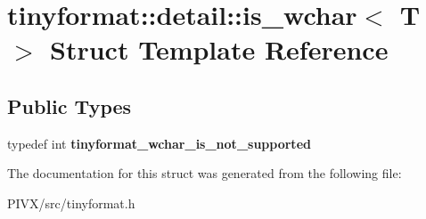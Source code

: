 \hypertarget{structtinyformat_1_1detail_1_1is__wchar}{}\section{tinyformat\+:\+:detail\+:\+:is\+\_\+wchar$<$ T $>$ Struct Template Reference}
\label{structtinyformat_1_1detail_1_1is__wchar}
\subsection*{Public Types}
\begin{DoxyCompactItemize}
\item 
\mbox{\label{structtinyformat_1_1detail_1_1is__wchar_a2006c700bf3264d6002993949bbaaac9}} 
typedef int {\bfseries tinyformat\+\_\+wchar\+\_\+is\+\_\+not\+\_\+supported}
\end{DoxyCompactItemize}


The documentation for this struct was generated from the following file\+:\begin{DoxyCompactItemize}
\item 
P\+I\+V\+X/src/tinyformat.\+h\end{DoxyCompactItemize}
